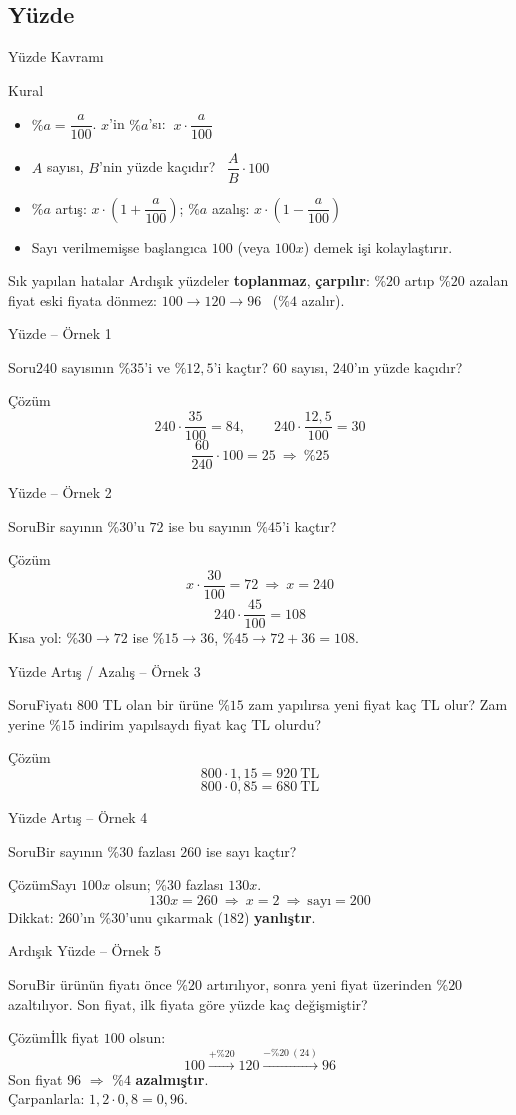 \documentclass[aspectratio=169,11pt,handout]{beamer}
\newcommand{\soru}[3]{%
\begin{frame}{#1}
  \begin{block}{Soru}\large #2\end{block}
  \pause
  \begin{exampleblock}{Çözüm}\large #3\end{exampleblock}
\end{frame}}
\begin{document}
\subsection{Yüzde}
\begin{frame}{Yüzde Kavramı}
\begin{block}{Kural}
\begin{itemize}
\item \(\%a=\dfrac{a}{100}\). \quad \(x\)'in \(\%a\)'sı: \(\ x\cdot\dfrac{a}{100}\)
\item \(A\) sayısı, \(B\)'nin yüzde kaçıdır? \ \(\dfrac{A}{B}\cdot 100\)
\item \(\%a\) artış: \(x\cdot\left(1+\dfrac{a}{100}\right)\); \quad \(\%a\) azalış: \(x\cdot\left(1-\dfrac{a}{100}\right)\)
\item Sayı verilmemişse başlangıca \(100\) (veya \(100x\)) demek işi kolaylaştırır.
\end{itemize}
\end{block}
\begin{alertblock}{Sık yapılan hatalar}
Ardışık yüzdeler \textbf{toplanmaz}, \textbf{çarpılır}: \(\%20\) artıp \(\%20\) azalan fiyat eski fiyata dönmez:
\(100\to 120\to 96\) \ (\(\%4\) azalır).
\end{alertblock}
\end{frame}

\soru{Yüzde -- Örnek 1}
{\(240\) sayısının \(\%35\)'i ve \(\%12{,}5\)'i kaçtır? \(60\) sayısı, \(240\)'ın yüzde kaçıdır?}
{\[240\cdot\frac{35}{100}=84,\qquad 240\cdot\frac{12{,}5}{100}=30\]
\[\frac{60}{240}\cdot 100=25\ \Rightarrow\ \%25\]}

\soru{Yüzde -- Örnek 2}
{Bir sayının \(\%30\)'u \(72\) ise bu sayının \(\%45\)'i kaçtır?}
{\[x\cdot\frac{30}{100}=72\ \Rightarrow\ x=240\]
\[240\cdot\frac{45}{100}=108\]
Kısa yol: \(\%30\to 72\) ise \(\%15\to 36\), \(\%45\to 72+36=108\).}

\soru{Yüzde Artış / Azalış -- Örnek 3}
{Fiyatı \(800\) TL olan bir ürüne \(\%15\) zam yapılırsa yeni fiyat kaç TL olur? Zam yerine \(\%15\) indirim yapılsaydı fiyat kaç TL olurdu?}
{\[800\cdot 1{,}15=920\ \text{TL}\]
\[800\cdot 0{,}85=680\ \text{TL}\]}

\soru{Yüzde Artış -- Örnek 4}
{Bir sayının \(\%30\) fazlası \(260\) ise sayı kaçtır?}
{Sayı \(100x\) olsun; \(\%30\) fazlası \(130x\).
\[130x=260\ \Rightarrow\ x=2\ \Rightarrow\ \text{sayı}=200\]
Dikkat: \(260\)'ın \(\%30\)'unu çıkarmak (\(182\)) \textbf{yanlıştır}.}

\soru{Ardışık Yüzde -- Örnek 5}
{Bir ürünün fiyatı önce \(\%20\) artırılıyor, sonra yeni fiyat üzerinden \(\%20\) azaltılıyor. Son fiyat, ilk fiyata göre yüzde kaç değişmiştir?}
{İlk fiyat \(100\) olsun:
\[100\xrightarrow{+\%20}120\xrightarrow{-\%20\ (24)}96\]
Son fiyat \(96\) \(\Rightarrow\) \(\%4\) \textbf{azalmıştır}.\\[3pt]
Çarpanlarla: \(1{,}2\cdot 0{,}8=0{,}96\).}
\end{document}
